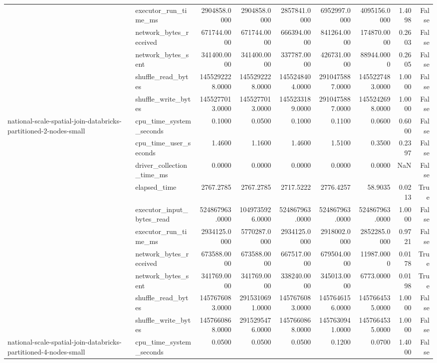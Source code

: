 \begin{tabular}{llrrrrrrr}
 & executor\_run\_time\_ms & 2904858.0000 & 2904858.0000 & 2857841.0000 & 6952997.0000 & 4095156.0000 & 1.4098 & False \\
 & network\_bytes\_received & 671744.0000 & 671744.0000 & 666394.0000 & 841264.0000 & 174870.0000 & 0.2603 & False \\
 & network\_bytes\_sent & 341400.0000 & 341400.0000 & 337787.0000 & 426731.0000 & 88944.0000 & 0.2605 & False \\
 & shuffle\_read\_bytes & 1455292228.0000 & 1455292228.0000 & 1455248404.0000 & 2910475887.0000 & 1455227483.0000 & 1.0000 & False \\
 & shuffle\_write\_bytes & 1455277013.0000 & 1455277013.0000 & 1455233189.0000 & 2910475887.0000 & 1455242698.0000 & 1.0000 & False \\
\cline{1-9}
\multirow[t]{10}{*}{national-scale-spatial-join-databricks-partitioned-2-nodes-small} & cpu\_time\_system\_seconds & 0.1000 & 0.0500 & 0.1000 & 0.1100 & 0.0600 & 0.6000 & False \\
 & cpu\_time\_user\_seconds & 1.4600 & 1.1600 & 1.4600 & 1.5100 & 0.3500 & 0.2397 & False \\
 & driver\_collection\_time\_ms & 0.0000 & 0.0000 & 0.0000 & 0.0000 & 0.0000 & NaN & False \\
 & elapsed\_time & 2767.2785 & 2767.2785 & 2717.5222 & 2776.4257 & 58.9035 & 0.0213 & True \\
 & executor\_input\_bytes\_read & 524867963.0000 & 1049735926.0000 & 524867963.0000 & 524867963.0000 & 524867963.0000 & 1.0000 & False \\
 & executor\_run\_time\_ms & 2934125.0000 & 5770287.0000 & 2934125.0000 & 2918002.0000 & 2852285.0000 & 0.9721 & False \\
 & network\_bytes\_received & 673588.0000 & 673588.0000 & 667517.0000 & 679504.0000 & 11987.0000 & 0.0178 & True \\
 & network\_bytes\_sent & 341769.0000 & 341769.0000 & 338240.0000 & 345013.0000 & 6773.0000 & 0.0198 & True \\
 & shuffle\_read\_bytes & 1457676083.0000 & 2915310691.0000 & 1457676083.0000 & 1457646156.0000 & 1457664535.0000 & 1.0000 & False \\
 & shuffle\_write\_bytes & 1457660868.0000 & 2915295476.0000 & 1457660868.0000 & 1457630941.0000 & 1457664535.0000 & 1.0000 & False \\
\cline{1-9}
\multirow[t]{10}{*}{national-scale-spatial-join-databricks-partitioned-4-nodes-small} & cpu\_time\_system\_seconds & 0.0500 & 0.0500 & 0.0500 & 0.1200 & 0.0700 & 1.4000 & False \\

\end{tabular}
